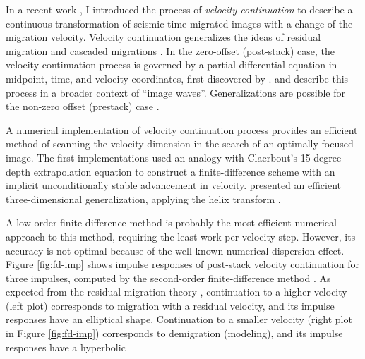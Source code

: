 \par
In a recent work \cite[]{me,Fomel.sep.92.159}, I
introduced the process of \emph{velocity continuation} to describe a
continuous transformation of seismic time-migrated images with a
change of the migration velocity. Velocity continuation generalizes
the ideas of residual migration
\cite[]{GEO50-01-01100126,Etgen.sepphd.68} and cascaded migrations
\cite[]{GEO52-05-06180643}. In the zero-offset (post-stack) case, the
velocity continuation process is governed by a partial differential
equation in midpoint, time, and velocity coordinates, first discovered
by \cite{Claerbout.sep.48.79}. \cite{hubral1} and
\cite{hubral2} describe this process in a broader context of
``image waves''. Generalizations are possible for the non-zero offset
(prestack) case \cite[]{Fomel.sep.92.159,SEG-1997-1762}.
\par
A numerical implementation of velocity continuation process provides
an efficient method of scanning the velocity dimension in the search
of an optimally focused image. The first implementations
\cite[]{Li.sep.48.85,Fomel.sep.92.159} used an analogy with Claerbout's
15-degree depth extrapolation equation to construct a
finite-difference scheme with an implicit unconditionally stable
advancement in velocity. \cite{Fomel.sep.95.sergey2} presented an
efficient three-dimensional generalization, applying the helix
transform \cite[]{Claerbout.sep.95.jon1}.
\par
{}
\par
A low-order finite-difference method is probably the most efficient
numerical approach to this method, requiring the least work per
velocity step. However, its accuracy is not optimal because of the
well-known numerical dispersion effect. Figure \ref{fig:fd-imp} shows
impulse responses of post-stack velocity continuation for three
impulses, computed by the second-order finite-difference method
\cite[]{Fomel.sep.92.159}. As expected from the residual migration
theory \cite[]{GEO50-01-01100126}, continuation to a higher velocity
(left plot) corresponds to migration with a residual velocity, and its
impulse responses have an elliptical shape. Continuation to a smaller
velocity (right plot in Figure \ref{fig:fd-imp}) corresponds to
demigration (modeling), and its impulse responses have a hyperbolic
